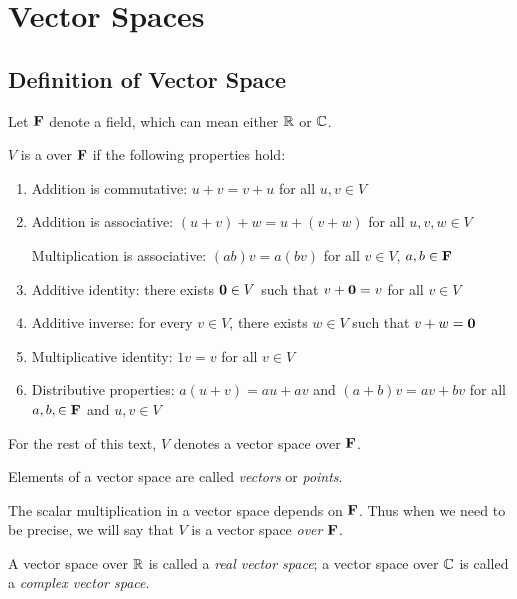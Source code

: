 \chapter{Vector Spaces}\label{chap:vector-spaces}
\section{Definition of Vector Space}
Let $\mathbf F$ denote a field, which can mean either $\mathbb R$ or $\mathbb C$.

\begin{definition}
$V$ is a  over $\mathbf F$ if the following properties hold:
\begin{enumerate}[label=(\roman*)]
\item Addition is commutative: $u+v=v+u$ for all $u,v\in V$
\item Addition is associative: $(u+v)+w=u+(v+w)$ for all $u,v,w\in V$

Multiplication is associative: $(ab)v=a(bv)$ for all $v\in V$, $a,b\in\mathbf F$
\item Additive identity: there exists $\vb{0}\in V$ such that $v+\vb{0}=v$ for all $v\in V$
\item Additive inverse: for every $v\in V$, there exists $w\in V$ such that $v+w=\vb{0}$
\item Multiplicative identity: $1v=v$ for all $v\in V$
\item Distributive properties: $a(u+v)=au+av$ and $(a+b)v=av+bv$ for all $a,b,\in\mathbf F$ and $u,v\in V$
\end{enumerate}
\end{definition}

\begin{notation}
For the rest of this text, $V$ denotes a vector space over $\mathbf F$.
\end{notation}

Elements of a vector space are called \emph{vectors} or \emph{points}.

\begin{remark}
The scalar multiplication in a vector space depends on $\mathbf F$. Thus when we need to be precise, we will say that $V$ is a vector space \emph{over $\mathbf F$}. 

A vector space over $\mathbb R$ is called a \emph{real vector space}; a vector space over $\mathbb C$ is called a \emph{complex vector space}.
\end{remark}

